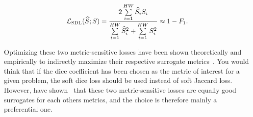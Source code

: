 \begin{equation}
  \mathcal{L}_{\mathrm{SDL}}(\predsegraster; \segraster)
  =
  \frac{%
    2 \sum\limits_{i = 1}^{HW}
    \predsegraster_i \segraster_i
  }{%
    \sum\limits_{i = 1}^{HW} \predsegraster_i^2
    +
    \sum\limits_{i = 1}^{HW}  \segraster_i^2
  }
  \approx
  1 - F_1.
  \label{eq:soft-dice-loss}
\end{equation}


Optimizing these two metric-sensitive losses have been shown theoretically and empirically to indirectly maximize their respective surrogate metrics~\cite{soft-losses}.
You would think that if the dice coefficient has been chosen as the metric of interest for a given problem, the soft dice loss should be used instead of soft Jaccard loss.
However, \citeauthor{soft-losses} have shown~\cite{soft-losses} that these two metric-sensitive losses are equally good surrogates for each others metrics, and the choice is therefore mainly a preferential one.
